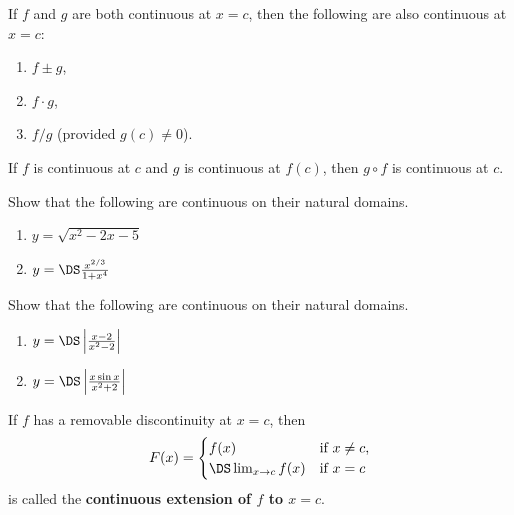 \vfill

\begin{theorem}
If $f$ and $g$ are both continuous at $x=c$, then the following are also continuous at $x=c$:
\begin{enumerate}
\item $f\pm g$,
\item $f\cdot g$,
\item $f/g$ (provided $g(c)\ne 0$).
\end{enumerate}
\end{theorem}

\begin{theorem}
If $f$ is continuous at $c$ and $g$ is continuous at $f(c)$, then $g\circ f$ is continuous at $c$.
\end{theorem}

\newpage

\begin{example}
Show that the following are continuous on their natural domains.
\begin{enumerate}
\item $y=\sqrt{x^2-2x-5}$
\vfill
\item $y=\DS\frac{x^{2/3}}{1+x^4}$
\vfill
\end{enumerate}
\end{example}

\newpage

\begin{example}
Show that the following are continuous on their natural domains.
\begin{enumerate}
\item $y=\DS\left|\frac{x-2}{x^2-2}\right|$
\vfill
\item $y=\DS\left|\frac{x\sin x}{x^2+2}\right|$
\vfill
\end{enumerate}
\end{example}

\newpage

\begin{definition}
If $f$ has a removable discontinuity at $x=c$, then
\begin{equation*}
F(x) = \begin{cases}
f(x) & \text{if }x\ne c,\\
\DS\lim_{x\to c}f(x) & \text{if } x=c
\end{cases}
\end{equation*}
is called the \textbf{continuous extension of $f$ to $x=c$}.
\end{definition}

